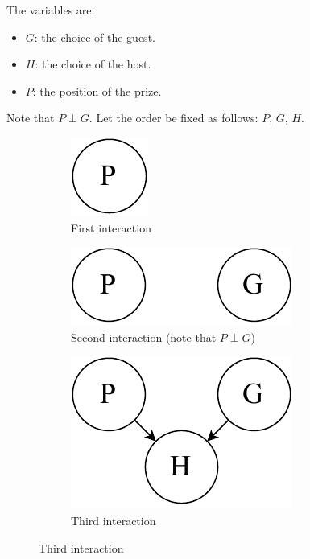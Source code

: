 \begin{example}
    The variables are:
    \begin{itemize}
        \item $G$: the choice of the guest.
        \item $H$: the choice of the host.
        \item $P$: the position of the prize.
    \end{itemize}
    Note that $P \perp G$.
    Let the order be fixed as follows: $P$, $G$, $H$.

    \begin{figure}[h]
        \begin{subfigure}{.3\textwidth}
            \centering
            \includegraphics[width=0.15\linewidth]{img/_monty_hall1.pdf}
            \caption{First interaction}
        \end{subfigure}
        \begin{subfigure}{.3\textwidth}
            \centering
            \includegraphics[width=0.45\linewidth]{img/_monty_hall2.pdf}
            \caption{Second interaction (note that $P \perp G$)}
        \end{subfigure}
        \begin{subfigure}{.3\textwidth}
            \centering
            \includegraphics[width=0.45\linewidth]{img/_monty_hall3.pdf}
            \caption{Third interaction}
        \end{subfigure}
    \end{figure}
\end{example}

